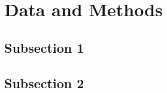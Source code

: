 
\section{Data and Methods}
\label{sec:data_meas}

\blindtext

\subsection{Subsection 1}
\label{subsec:data_1}


\blindtext

\subsection{Subsection 2}
\label{subsec:data_2}

\blindtext